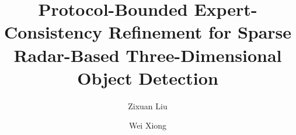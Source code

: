 \documentclass[preprint,12pt,times]{elsarticle}
\begin{document}
\begin{frontmatter}

\title{Protocol-Bounded Expert-Consistency Refinement for Sparse Radar-Based
Three-Dimensional Object Detection}

\author[inst1]{Zixuan Liu}
\author[inst2,inst3]{Wei Xiong}
\address[inst1]{Detroit Green Technology Institute, Hubei University of
Technology, Wuhan 430068, China}
\address[inst2]{School of Electrical and Electronic Engineering, Hubei
University of Technology, Wuhan 430068, China}
\address[inst3]{Department of Computer Science and Engineering, University of
South Carolina, Columbia, SC 29201, USA}


\end{frontmatter}
\end{document}

